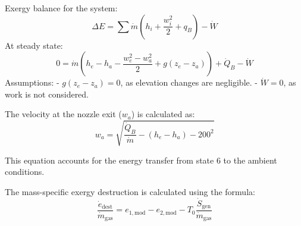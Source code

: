 Exergy balance for the system:  
\[
\Delta E = \sum \dot{m} \left( h_i + \frac{w_i^2}{2} + q_B \right) - \dot{W}
\]  
At steady state:  
\[
0 = \dot{m} \left( h_e - h_a - \frac{w_e^2 - w_a^2}{2} + g(z_e - z_a) \right) + \dot{Q}_B - \dot{W}
\]  
Assumptions:  
- \( g(z_e - z_a) = 0 \), as elevation changes are negligible.  
- \( \dot{W} = 0 \), as work is not considered.  

The velocity at the nozzle exit (\( w_a \)) is calculated as:  
\[
w_a = \sqrt{\frac{\dot{Q}_B}{\dot{m}} - (h_e - h_a) - 200^2}
\]  

This equation accounts for the energy transfer from state 6 to the ambient conditions.

The mass-specific exergy destruction is calculated using the formula:  
\[
\frac{\dot{e}_{\text{dest}}}{\dot{m}_{\text{gas}}} = e_{1,\text{mod}} - e_{2,\text{mod}} - T_0 \frac{\dot{S}_{\text{gen}}}{\dot{m}_{\text{gas}}}
\]